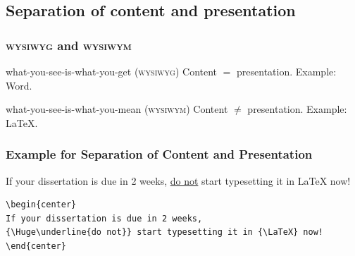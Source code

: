 \documentclass{beamer} %
\begin{document}
 
\subsection{Separation of content and presentation}

\begin{frame}
\frametitle{\textsc{wysiwyg} and \textsc{wysiwym}}
\begin{block}{what-you-see-is-what-you-get (\textsc{wysiwyg})}
Content $=$ presentation. Example: Word.
\end{block}
\begin{block}{  what-you-see-is-what-you-mean (\textsc{wysiwym})}
Content $\neq$ presentation. Example: {\LaTeX}.
\end{block}
\end{frame}

\begin{frame}[fragile]
\frametitle{Example for Separation of Content and Presentation}
\begin{center}
If your dissertation is due in 2 weeks, 
{\Huge\underline{do not}} start typesetting it in {\LaTeX} now!
\end{center}
\begin{scriptsize}
\begin{verbatim}
\begin{center}
If your dissertation is due in 2 weeks, 
{\Huge\underline{do not}} start typesetting it in {\LaTeX} now!
\end{center}
\end{verbatim}
\end{scriptsize}
\end{frame}
 
\end{document}

